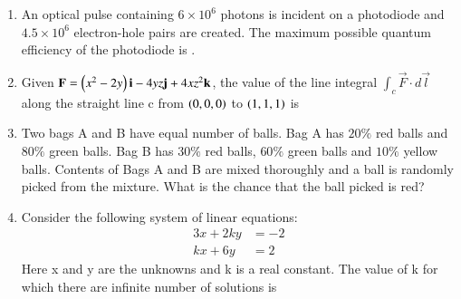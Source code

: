 \documentclass[journal,12pt,onecolumn]{IEEEtran}
\theoremstyle{remark}
\begin{document}
\begin{enumerate}
    \hfill{}

    \item An optical pulse containing $6\times10^{6}$ photons is incident on a photodiode and $4.5\times10^{6}$ electron-hole pairs are created. The maximum possible quantum efficiency  of the photodiode is \underline{\hspace{2cm}}.
    
    \hfill{}
    
    \item Given $\mathbf{F}=\left(x^{2}-2y\right)\mathbf{i}-4yz\mathbf{j}+4xz^{2}\mathbf{k}$, the value of the line integral $\int_{c}\vec{F}\cdot d\vec{l}$ along the straight line c from $\left(0,0,0\right)$ to $\left(1,1,1\right)$ is
    
    \hfill{}
    \begin{enumerate}
    \end{enumerate}

    \item Two bags A and B have equal number of balls. Bag A has $20\%$ red balls and $80\%$ green balls. Bag B has $30\%$ red balls, $60\%$ green balls and $10\%$ yellow balls. Contents of Bags A and B are mixed thoroughly and a ball is randomly picked from the mixture. What is the chance that the ball picked is red?
    
    \hfill{}
    \begin{enumerate}
    \end{enumerate}

    \item Consider the following system of linear equations:
    \begin{align*}
    3x+2ky&=-2\\
    kx+6y&=2
    \end{align*}
    Here x and y are the unknowns and k is a real constant. The value of k for which there are infinite number of solutions is
    

\end{enumerate}
\end{document}
